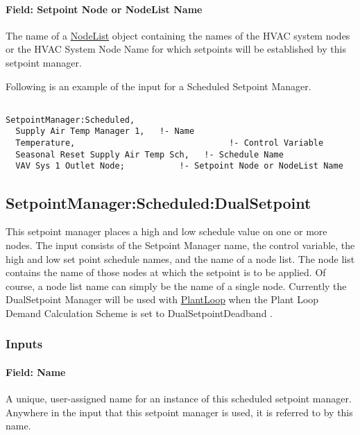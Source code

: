 \paragraph{Field: Setpoint Node or NodeList Name}\label{field-setpoint-node-or-nodelist-name}

The name of a \hyperref[nodelist]{NodeList} object containing the names of the HVAC system nodes or the HVAC System Node Name for which setpoints will be established by this setpoint manager.

Following is an example of the input for a Scheduled Setpoint Manager.

\begin{lstlisting}

SetpointManager:Scheduled,
  Supply Air Temp Manager 1,   !- Name
  Temperature,                               !- Control Variable
  Seasonal Reset Supply Air Temp Sch,   !- Schedule Name
  VAV Sys 1 Outlet Node;           !- Setpoint Node or NodeList Name
\end{lstlisting}

\subsection{SetpointManager:Scheduled:DualSetpoint}\label{setpointmanagerscheduleddualsetpoint}

This setpoint manager places a high and low schedule value on one or more nodes. The input consists of the Setpoint Manager name, the control variable, the high and low set point schedule names, and the name of a node list. The node list contains the name of those nodes at which the setpoint is to be applied. Of course, a node list name can simply be the name of a single node. Currently the DualSetpoint Manager will be used with \hyperref[plantloop]{PlantLoop} when the Plant Loop Demand Calculation Scheme is set to DualSetpointDeadband .

\subsubsection{Inputs}\label{inputs-1-040}

\paragraph{Field: Name}\label{field-name-1-039}

A unique, user-assigned name for an instance of this scheduled setpoint manager. Anywhere in the input that this setpoint manager is used, it is referred to by this name.

